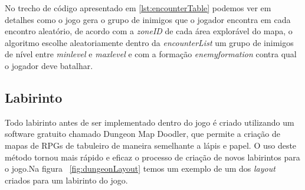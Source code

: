 \documentclass[
	12pt,				%
	openright,			%
	twoside,			%
	a4paper,			%
	english,			%
	french,				%
	spanish,			%
	brazil				%
	]{abntex2}
\begin{document}
No trecho de código apresentado em \ref{lst:encounterTable} podemos ver em detalhes como o jogo gera o grupo de inimigos que o jogador encontra em cada encontro aleatório, de acordo com a \emph{zoneID} de cada área explorável do mapa, o algoritmo escolhe aleatoriamente dentro da \emph{encounterList} um grupo de inimigos de nível entre \emph{min\textunderscore level} e \emph{max\textunderscore level} e com a formação \emph{enemy\textunderscore formation} contra qual o jogador deve batalhar.

\subsection{Labirinto}

	Todo labirinto antes de ser implementado dentro do jogo é criado utilizando um software gratuito chamado Dungeon Map Doodler, que permite a criação de mapas de RPGs de tabuleiro de maneira semelhante a lápis e papel. O uso deste método tornou mais rápido e eficaz o processo de criação de novos labirintos para o jogo.Na figura ~\ref{fig:dungeonLayout} temos um exemplo de um dos \emph{layout} criados para um labirinto do jogo.
	
\end{document}
